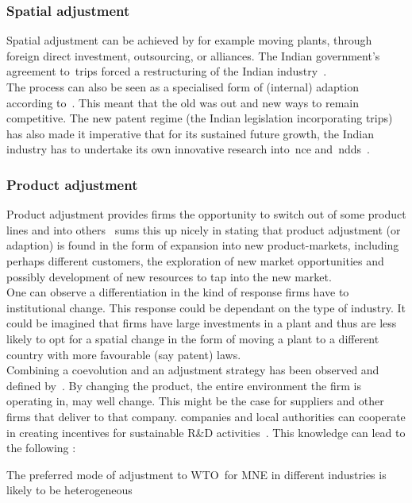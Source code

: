 \subsubsection{Spatial adjustment}
Spatial adjustment can be achieved by for example moving plants, through foreign direct investment, outsourcing, or alliances. 
The Indian government’s agreement to~\gls{trips} forced a restructuring of the Indian industry~\citep{Lawton:2009vw}.\\
The process can also be seen as a specialised form of (internal) adaption according to~\citep{Cantwell:2009hg,Hoekman:2004wa}.
This meant that the old was out and new ways to remain competitive.
The new patent regime (the Indian legislation incorporating \gls{trips}) has also made it imperative that for its sustained future growth, the Indian \pharma industry has to undertake its own innovative research into~\gls{nce} and~\gls{ndds}~\citep{Lawton:2009vw}.\\

\subsubsection{Product adjustment}
Product adjustment provides firms the opportunity to switch out of some product lines and into others~\citep{Ferreira:2010tp} sums this up nicely in stating that product adjustment (or adaption) is found in the form of expansion into new product-markets, including perhaps different customers, the exploration of new market opportunities and possibly development of new resources to tap into the new market.\\
One can observe a differentiation in the kind of response firms have to institutional change. 
This response could be dependant on the type of industry.
It could be imagined that firms have large investments in a plant and thus are less likely to opt for a spatial change in the form of moving a plant to a different country with more favourable (say patent) laws.\\ 
Combining a coevolution and an adjustment strategy has been observed and defined by~\citep{Cantwell:2009hg}.
By changing the product, the entire environment the firm is operating in, may well change.
This might be the case for suppliers and other firms that deliver to that company.
companies and local authorities can cooperate in creating incentives for sustainable R\&D activities~\citep{Bloomberg:2006,Deloitte:2013}.
This knowledge can lead to the following \wpro:

\begin{WP}\label{adjustement_heterogeneous}
  The preferred mode of adjustment to WTO~\rr for MNE in different industries is likely to be heterogeneous
\end{WP}
